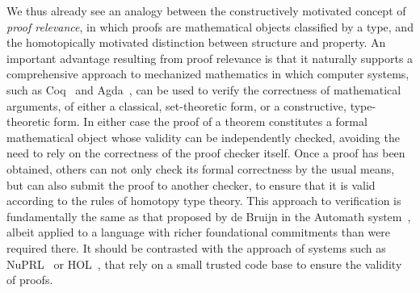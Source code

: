 \documentclass[11pt]{article}
\theoremstyle{remark}
\theoremstyle{definition}
\begin{document}
We thus already see an analogy between the constructively motivated concept of \emph{proof relevance}, in which proofs
are mathematical objects classified by a type, and the homotopically motivated distinction between structure and property.  
An important advantage resulting from proof relevance is that it naturally 
supports a comprehensive approach to mechanized mathematics in which computer systems, such as Coq~\cite{Coq}
and Agda~\cite{Agda}, can be used to verify the correctness of mathematical arguments, of either a classical, set-theoretic
form, or a constructive, type-theoretic form.  In either case the proof of a theorem constitutes a formal mathematical
object whose validity can be independently checked, avoiding the need to rely on the correctness of the proof checker
itself.  Once a proof has been obtained, others can not only check its formal correctness by the usual means, but can also
submit the proof to another checker, to ensure that it is valid according to the
rules of homotopy type theory. 
This approach to verification is fundamentally the same as that proposed by de Bruijn in the Automath
system~\cite{Automath}, albeit applied to a language with richer foundational
commitments than were required there.
It should be contrasted with the approach of systems such as NuPRL~\cite{NuPRL-Site} or HOL~\cite{HOL,HOL-Light}, that rely
on a small trusted code base to ensure the validity of proofs.
\end{document}
